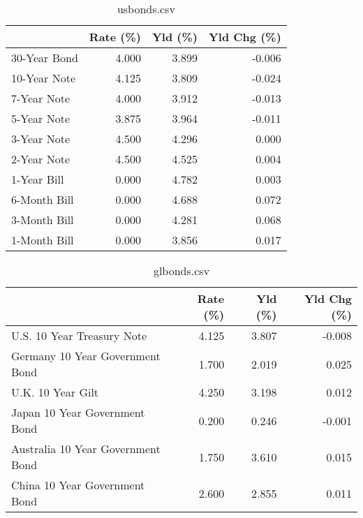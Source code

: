 \documentclass{article}%
\begin{document}
%


\begin{table}[htbp]%
\caption{usbonds.csv}%
\centering%
\begin{adjustbox}{width=1\textwidth}%
\begin{tabular}{lrrr}
\toprule
             &  Rate (\%) &  Yld (\%) &  Yld Chg (\%) \\
\midrule
30-Year Bond &     4.000 &    3.899 &       -0.006 \\
10-Year Note &     4.125 &    3.809 &       -0.024 \\
 7-Year Note &     4.000 &    3.912 &       -0.013 \\
 5-Year Note &     3.875 &    3.964 &       -0.011 \\
 3-Year Note &     4.500 &    4.296 &        0.000 \\
 2-Year Note &     4.500 &    4.525 &        0.004 \\
 1-Year Bill &     0.000 &    4.782 &        0.003 \\
6-Month Bill &     0.000 &    4.688 &        0.072 \\
3-Month Bill &     0.000 &    4.281 &        0.068 \\
1-Month Bill &     0.000 &    3.856 &        0.017 \\
\bottomrule
\end{tabular}
%
\end{adjustbox}%
\end{table}

%


\begin{table}[htbp]%
\caption{glbonds.csv}%
\centering%
\begin{adjustbox}{width=1\textwidth}%
\begin{tabular}{lrrr}
\toprule
                                  &  Rate (\%) &  Yld (\%) &  Yld Chg (\%) \\
\midrule
       U.S. 10 Year Treasury Note &     4.125 &    3.807 &       -0.008 \\
  Germany 10 Year Government Bond &     1.700 &    2.019 &        0.025 \\
                U.K. 10 Year Gilt &     4.250 &    3.198 &        0.012 \\
    Japan 10 Year Government Bond &     0.200 &    0.246 &       -0.001 \\
Australia 10 Year Government Bond &     1.750 &    3.610 &        0.015 \\
    China 10 Year Government Bond &     2.600 &    2.855 &        0.011 \\
\bottomrule
\end{tabular}
%
\end{adjustbox}%
\end{table}
\end{document}
